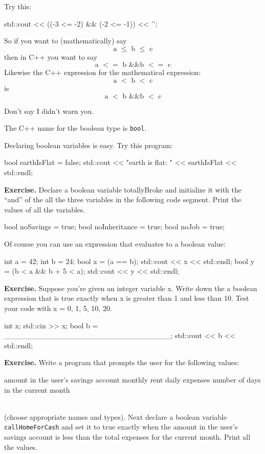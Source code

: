 {{{{{Try this:
\begin{console}
std::cout << ((-3 <= -2) && (-2 <= -1)) << '\n';
\end{console}

So if you want to (mathematically) say
\[
\text{a $\leq$ b $\leq$ c}
\]
then in C++ you want to say
\[
\text{a $<=$ b \&\& b $<=$ c}
\]
Likewise the C++ expression for the mathematical expression:
\[
\text{a $<$ b $<$ c}
\]
is
\[
\text{a $<$ b \&\& b $<$ c}
\]

Don't say I didn't warn you.



The C++ name for the boolean type is \verb!bool!.

Declaring boolean variables is easy. Try this program:
\begin{console}
bool earthIsFlat = false;
std::cout << "earth is flat: " << earthIsFlat
          << std::endl;
\end{console}

\textbf{Exercise.} Declare a boolean variable totallyBroke and initialize it
with the “and” of the all the three variables in the following code segment.
Print the values of all the variables.

\begin{console}
bool noSavings = true;
bool noInheritance = true;
bool noJob = true;


\end{console}

Of course you can use an expression that evaluates to a boolean value:
\begin{console}
int a = 42;
int b = 24;
bool x = (a == b);
std::cout << x << std::endl;
bool y = (b < a && b + 5 < a);
std::cout << y << std::endl;
\end{console}

\textbf{Exercise.} Suppose you're given an integer variable x. Write down the a boolean expression that is true exactly when x is greater than 1 and less than 10. Test your code with x = 0, 1, 5, 10, 20.
\begin{console}
int x;
std::cin >> x;
bool b = _______________________________;
std::cout << b << std::endl;
\end{console}

\textbf{Exercise.} Write a program that prompts the user for the following values:\\
\begin{tightlist}
\li amount in the user's savings account
\li monthly rent
\li daily expenses
\li number of days in the current month
\end{tightlist}\\
(choose appropriate names and types). Next declare a boolean variable
\verb!callHomeForCash! and set it to true exactly when the amount in the
user's savings account is less than the total expenses for the current
month. Print all the values.


}}}}}
